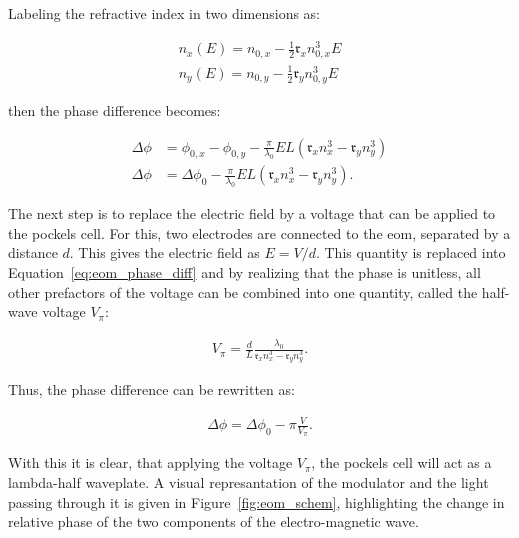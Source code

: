 Labeling the refractive index in two dimensions as:

\begin{align}
	n_x(E) = n_{0,x} - \frac{1}{2} \mathfrak{r}_x n_{0,x}^3 E \\
	n_y(E) = n_{0,y} - \frac{1}{2} \mathfrak{r}_y n_{0,y}^3 E
\end{align}

then the phase difference becomes:

\begin{align}
	\Delta \phi & = \phi_{0,x} - \phi_{0,y} - \frac{\pi}{\lambda_0} E L \left(\mathfrak{r}_x n_x^3 - \mathfrak{r}_y n_y^3\right) \\
	\Delta \phi & = \Delta \phi_{0} - \frac{\pi}{\lambda_0} E L \left(\mathfrak{r}_x n_x^3 - \mathfrak{r}_y n_y^3\right).
	\label{eq:eom_phase_diff}
\end{align}

\begin{figure}[t]%
\end{figure}

The next step is to replace the electric field by a voltage that can be applied to the pockels cell. For this, two electrodes are connected to the \ac{eom}, separated by a distance $d$. This gives the electric field as $E=V/d$. This quantity is replaced into Equation~\ref{eq:eom_phase_diff} and by realizing that the phase is unitless, all other prefactors of the voltage can be combined into one quantity, called the half-wave voltage $V_\pi$:

\begin{align}
	V_\pi = \frac{d}{L} \frac{\lambda_0}{\mathfrak{r}_x n_x^3 - \mathfrak{r}_y n_y^3}.
\end{align}

Thus, the phase difference can be rewritten as:

\begin{align}
	\label{eq:eom_phase_diff}
	\Delta \phi = \Delta \phi_0 - \pi \frac{V}{V_\pi}.
\end{align}

With this it is clear, that applying the voltage $V_\pi$, the pockels cell will act as a lambda-half waveplate. A visual represantation of the modulator and the light passing through it is given in Figure~\ref{fig:eom_schem}, highlighting the change in relative phase of the two components of the electro-magnetic wave.

